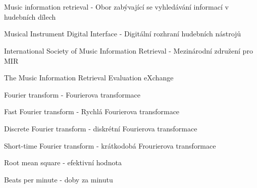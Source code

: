 \cleardoublepage
\chapter*{\listofabbrevname}
{}

\begin{acronym}[KolikMista]
		{Music information retrieval - Obor zabývající se vyhledávání informací v hudebních dílech}
	
		{Musical Instrument Digital Interface - Digitální rozhraní hudebních nástrojů}

		{International Society of Music Information Retrieval - Mezinárodní združení pro \acs*{MIR}}	

		{The Music Information Retrieval Evaluation eXchange}

		{Fourier transform - Fourierova transformace}
		
		{Fast Fourier transform - Rychlá Fourierova transformace}

		{Discrete Fourier transform - diskrétní Fourierova transformace}

		{Short-time Fourier transform - krátkodobá Frourierova transformace}
	
		{Root mean square - efektivní hodnota}

		{Beats per minute - doby za minutu}
\end{acronym}
